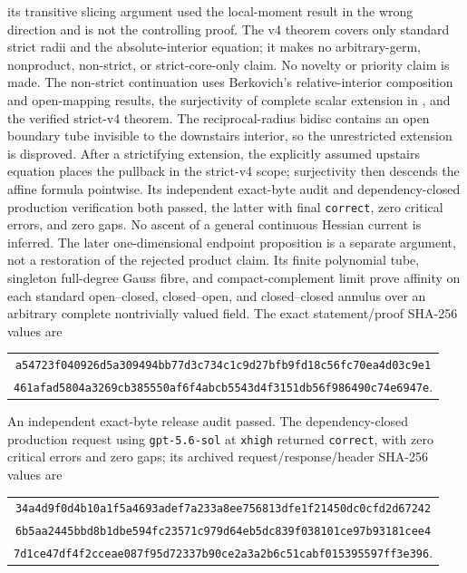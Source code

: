 its transitive slicing argument used the local-moment result in the wrong
direction and is not the controlling proof.  The v4 theorem covers only
standard strict radii and the absolute-interior equation; it makes no
arbitrary-germ, nonproduct, non-strict, or strict-core-only claim.  No
novelty or priority claim is made.
The non-strict continuation
 uses Berkovich's relative-interior
composition and open-mapping results, the surjectivity of complete scalar
extension in \cite[\S11.1.9]{CLD25}, and the verified strict-v4 theorem.
The reciprocal-radius bidisc contains an open boundary tube invisible to the
downstairs interior, so the unrestricted extension is disproved.  After a
strictifying extension, the explicitly assumed upstairs equation places the
pullback in the strict-v4 scope; surjectivity then descends the affine formula
pointwise.  Its independent exact-byte audit and dependency-closed production
verification both passed, the latter with final \texttt{correct}, zero
critical errors, and zero gaps.  No ascent of a general continuous Hessian
current is inferred.
The later one-dimensional endpoint proposition
 is a separate argument,
not a restoration of the rejected product claim.  Its finite polynomial
tube, singleton full-degree Gauss fibre, and compact-complement limit prove
affinity on each standard open--closed, closed--open, and closed--closed
annulus over an arbitrary complete nontrivially valued field.  The exact
statement/proof SHA-256 values are
\begin{center}
\small
\begin{tabular}{@{}c@{}}
\nolinkurl{a54723f040926d5a309494bb77d3c734c1c9d27bfb9fd18c56fc70ea4d03c9e1}\\
\nolinkurl{461afad5804a3269cb385550af6f4abcb5543d4f3151db56f986490c74e6947e}.
\end{tabular}
\end{center}
An independent exact-byte release audit passed.  The dependency-closed
production request using \texttt{gpt-5.6-sol} at \texttt{xhigh} returned
\texttt{correct}, with zero critical errors and zero gaps; its archived
request/response/header SHA-256 values are
\begin{center}
\small
\begin{tabular}{@{}c@{}}
\nolinkurl{34a4d9f0d4b10a1f5a4693adef7a233a8ee756813dfe1f21450dc0cfd2d67242}\\
\nolinkurl{6b5aa2445bbd8b1dbe594fc23571c979d64eb5dc839f038101ce97b93181cee4}\\
\nolinkurl{7d1ce47df4f2cceae087f95d72337b90ce2a3a2b6c51cabf015395597ff3e396}.
\end{tabular}
\end{center}
